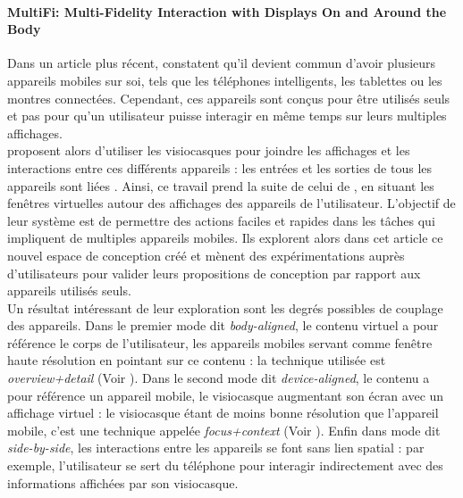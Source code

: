
\paragraph{\foreignlanguage{english}{MultiFi: Multi-Fidelity Interaction with Displays On and Around the Body}}
Dans un article plus récent, \cite{GrubertKranzQuigley2015} constatent qu'il devient commun d'avoir plusieurs appareils mobiles sur soi, tels que les téléphones intelligents, les tablettes ou les montres connectées. Cependant, ces appareils sont conçus pour être utilisés seuls et pas pour qu'un utilisateur puisse interagir en même temps sur leurs multiples affichages.\\
\citeauthor{GrubertKranzQuigley2015} proposent alors d'utiliser les visiocasques pour joindre les affichages et les interactions entre ces différents appareils : les entrées et les sorties de tous les appareils sont liées . Ainsi, ce travail prend la suite de celui de \citet{EnsFinneganIrani2014}, en situant les fenêtres virtuelles autour des affichages des appareils de l'utilisateur. L'objectif de leur système est de permettre des actions faciles et rapides dans les tâches qui impliquent de multiples appareils mobiles. Ils explorent alors dans cet article ce nouvel espace de conception créé et mènent des expérimentations auprès d'utilisateurs pour valider leurs propositions de conception par rapport aux appareils utilisés seuls.\\
Un résultat intéressant de leur exploration sont les degrés possibles de couplage des appareils. Dans le premier mode dit \emph{body-aligned}, le contenu virtuel a pour référence le corps de l'utilisateur, les appareils mobiles servant comme fenêtre haute résolution en pointant sur ce contenu : la technique utilisée est \emph{overview+detail} (Voir \citep{BergeSerranoPerelmanEtAl2014}). Dans le second mode dit \emph{device-aligned}, le contenu a pour référence un appareil mobile, le visiocasque augmentant son écran avec un affichage virtuel : le visiocasque étant de moins bonne résolution que l'appareil mobile, c'est une technique appelée \emph{focus+context} (Voir \cite{BaudischGoodStewart2001}). Enfin dans mode dit \emph{side-by-side}, les interactions entre les appareils se font sans lien spatial : par exemple, l'utilisateur se sert du téléphone pour interagir indirectement avec des informations affichées par son visiocasque.\\
